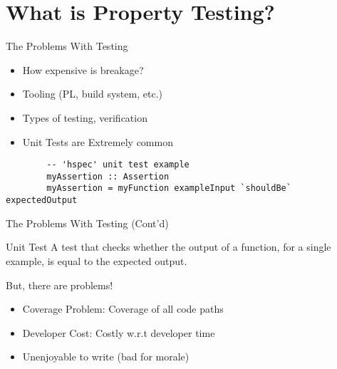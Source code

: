 \section{What is Property Testing?}
    
    \frame{\sectionpage}
   
   
    \begin{frame}[fragile]{The Problems With Testing}
        \begin{itemize}
            \item How expensive is breakage?
            \item Tooling (PL, build system, etc.)
            \item Types of testing, verification
            \item Unit Tests are Extremely common
        \end{itemize}
        \begin{verbatim}
        -- 'hspec' unit test example
        myAssertion :: Assertion
        myAssertion = myFunction exampleInput `shouldBe` expectedOutput
        \end{verbatim}
    \end{frame}

   \begin{frame}[fragile]{The Problems With Testing (Cont'd)}
       \begin{definition}{Unit Test}
          A test that checks whether the output of a function, for a single
          example, is equal to the expected output.
       \end{definition}
       
       But, there are problems!
       
       \begin{itemize}
           \item Coverage Problem: Coverage of all code paths
           \item Developer Cost: Costly w.r.t developer time
           \item Unenjoyable to write (bad for morale)
       \end{itemize}
   \end{frame}
   
